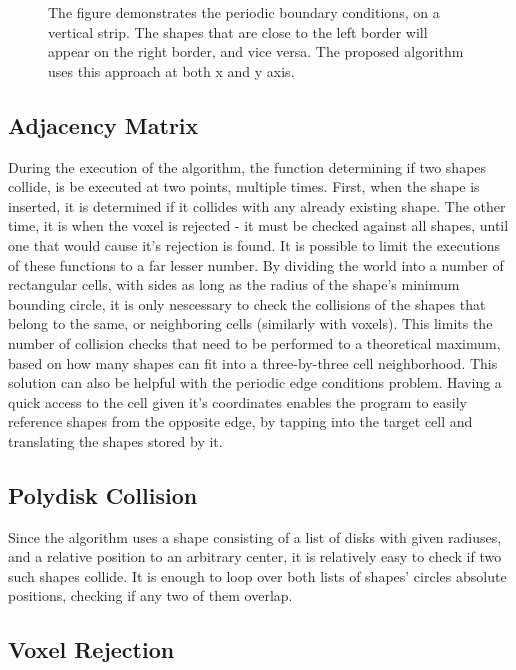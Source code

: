 \documentclass[12pt, oneside]{report}
\begin{document}
\begin{figure}[H]
\caption{The figure demonstrates the periodic boundary conditions, on a vertical strip. The shapes that are close to the left border will appear on the right border, and vice versa. The proposed algorithm uses this approach at both x and y axis.}
\end{figure}

\subsection{Adjacency Matrix}

During the execution of the algorithm, the function determining if two shapes collide, is be executed at two points, multiple times. First, when the shape is inserted, it is determined if it collides with any already existing shape. The other time, it is when the voxel is rejected - it must be checked against all shapes, until one that would cause it's rejection is found. It is possible to limit the executions of these functions to a far lesser number. By dividing the world into a number of rectangular cells, with sides as long as the radius of the shape's minimum bounding circle, it is only nescessary to check the collisions of the shapes that belong to the same, or neighboring cells (similarly with voxels). This limits the number of collision checks that need to be performed to a theoretical maximum, based on how many shapes can fit into a three-by-three cell neighborhood. \newline
This solution can also be helpful with the periodic edge conditions problem. Having a quick access to the cell given it's coordinates enables the program to easily reference shapes from the opposite edge, by tapping into the target cell and translating the shapes stored by it.

\subsection{Polydisk Collision}

Since the algorithm uses a shape consisting of a list of disks with given radiuses, and a relative position to an arbitrary center, it is relatively easy to check if two such shapes collide. It is enough to loop over both lists of shapes' circles absolute positions, checking if any two of them overlap. \newline

\subsection{Voxel Rejection}
\end{document}
